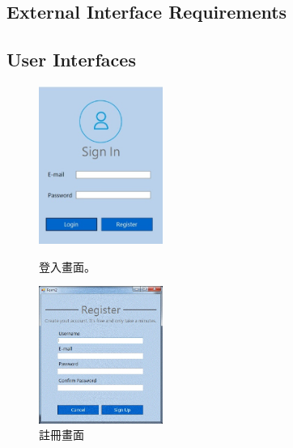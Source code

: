 \documentclass{scrreprt}
\begin{document}
\begin{CJK}{UTF8}{bkai}
\chapter{External Interface Requirements}

\section{User Interfaces}
\begin{figure}[h]
	\centering
	\includegraphics[width=0.36\textwidth]{signin.jpg}
	\caption{登入畫面。}
	\centering
	\includegraphics[width=0.36\textwidth]{register.jpg}
	\caption{註冊畫面}
\end{figure}


\end{CJK}
\end{document}
